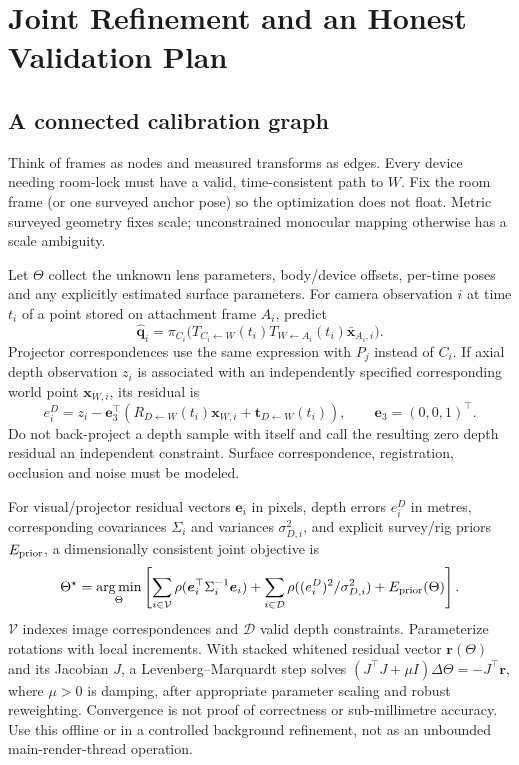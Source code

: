 \documentclass[11pt,a4paper]{article}
\newcommand{\T}[2]{T_{#1\leftarrow #2}}
\newcommand{\Rot}[2]{R_{#1\leftarrow #2}}
\newcommand{\tr}[2]{\bm{t}_{#1\leftarrow #2}}
\newcommand{\pt}[1]{\bm{x}_{#1}}
\newcommand{\hpt}[1]{\bar{\bm{x}}_{#1}}
\DeclareMathOperator*{\argmin}{arg\,min}
\begin{document}
\section{Joint Refinement and an Honest Validation Plan}
\label{sec:validation}

\subsection{A connected calibration graph}
Think of frames as nodes and measured transforms as edges.
Every device needing room-lock must have a valid, time-consistent path to
$W$. Fix the room frame (or one surveyed anchor pose) so the optimization
does not float. Metric surveyed geometry fixes scale; unconstrained
monocular mapping otherwise has a scale ambiguity.

Let $\Theta$ collect the unknown lens parameters, body/device offsets,
per-time poses and any explicitly estimated surface parameters.
For camera observation $i$ at time $t_i$ of a point stored on attachment
frame $A_i$, predict
\begin{equation}
\hat{\bm{q}}_i=
\pi_{C_i}\bigl(\T{C_i}{W}(t_i)\T{W}{A_i}(t_i)
\hpt{A_i,i}\bigr).
\end{equation}
Projector correspondences use the same expression with $P_j$ instead of
$C_i$. If axial depth observation $z_i$ is associated with an independently
specified corresponding world point $\pt{W,i}$, its residual is
\begin{equation}
e_i^D=z_i-\bm{e}_3^\top
\left(\Rot{D}{W}(t_i)\pt{W,i}+\tr{D}{W}(t_i)\right),
\qquad \bm{e}_3=(0,0,1)^\top.
\end{equation}
Do not back-project a depth sample with itself and call the resulting
zero depth residual an independent constraint. Surface correspondence,
registration, occlusion and noise must be modeled.

For visual/projector residual vectors $\bm{e}_i$ in pixels, depth errors
$e_i^D$ in metres, corresponding covariances $\Sigma_i$ and variances
$\sigma_{D,i}^2$, and explicit survey/rig priors $E_{\rm prior}$, a
dimensionally consistent joint objective is
\begin{equation}
\Theta^\star=\argmin_\Theta\left[
\sum_{i\in\mathcal V}\rho(\bm{e}_i^\top\Sigma_i^{-1}\bm{e}_i)
+\sum_{i\in\mathcal D}\rho((e_i^D)^2/\sigma_{D,i}^2)
+E_{\rm prior}(\Theta)\right].
\label{eq:bundle}
\end{equation}
$\mathcal V$ indexes image correspondences and $\mathcal D$ valid depth
constraints. Parameterize rotations with local increments.
With stacked whitened residual vector $\bm{r}(\Theta)$ and its Jacobian
$J$, a Levenberg--Marquardt step solves
$(J^\top J+\mu I)\Delta\Theta=-J^\top\bm{r}$, where $\mu>0$ is damping,
after appropriate parameter scaling and robust reweighting.
Convergence is not proof of correctness or sub-millimetre accuracy.
Use this offline or in a controlled background refinement, not as an
unbounded main-render-thread operation.
\end{document}
